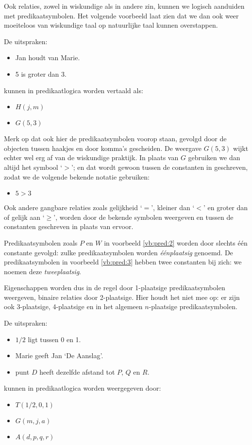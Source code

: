 Ook relaties, zowel in wiskundige als in andere zin, kunnen we logisch aanduiden met predikaatsymbolen. Het volgende voorbeeld laat zien dat we dan ook weer moeiteloos van wiskundige taal op natuurlijke taal kunnen overstappen.

\begin{example}\label{vb:pred:3}
De uitspraken:
\begin{itemize}
    \item Jan houdt van Marie.
    \item 5 is groter dan 3.
\end{itemize}
kunnen in predikaatlogica worden vertaald als:
\begin{itemize}
    \item $H(j, m)$
    \item $G(5, 3)$
\end{itemize}
Merk op dat ook hier de predikaatsymbolen voorop staan, gevolgd door de objecten tussen haakjes en door komma's gescheiden. De weergave $G(5,3)$ wijkt echter wel erg af van de wiskundige praktijk. In plaats van $G$ gebruiken we dan altijd het symbool `$>$'; en dat wordt gewoon tussen de constanten in geschreven, zodat we de volgende bekende notatie gebruiken:
\begin{itemize}
    \item $5>3$
\end{itemize}
\end{example}

Ook andere gangbare relaties zoals gelijkheid `$=$', kleiner dan `$<$' en groter dan of gelijk aan `$\geq$', worden door de bekende symbolen weergeven en tussen de constanten geschreven in plaats van ervoor.

Predikaatsymbolen zoals $P$ en $W$ in voorbeeld \ref{vb:pred:2} worden door slechts \'e\'en constante gevolgd: zulke predikaatsymbolen worden \textit{\'e\'enplaatsig} genoemd. De predikaatsymbolen in voorbeeld \ref{vb:pred:3} hebben twee constanten bij zich: we noemen deze \textit{tweeplaatsig}.

Eigenschappen worden dus in de regel door 1-plaatsige predikaatsymbolen weergeven, binaire relaties door 2-plaatsige. Hier houdt het niet mee op: er zijn ook 3-plaatsige, 4-plaatsige en in het algemeen $n$-plaatsige predikaatsymbolen.

\begin{example}\label{vb:pred:4}
De uitspraken:
\begin{itemize}
    \item $1/2$ ligt tussen 0 en 1.
    \item Marie geeft Jan `De Aanslag'.
    \item punt $D$ heeft dezelfde afstand tot $P$, $Q$ en $R$.
\end{itemize}
kunnen in predikaatlogica worden weergegeven door:
\begin{itemize}
    \item $T(1/2,0,1)$
    \item $G(m,j,a)$
    \item $A(d,p,q,r)$
\end{itemize}
\end{example}

